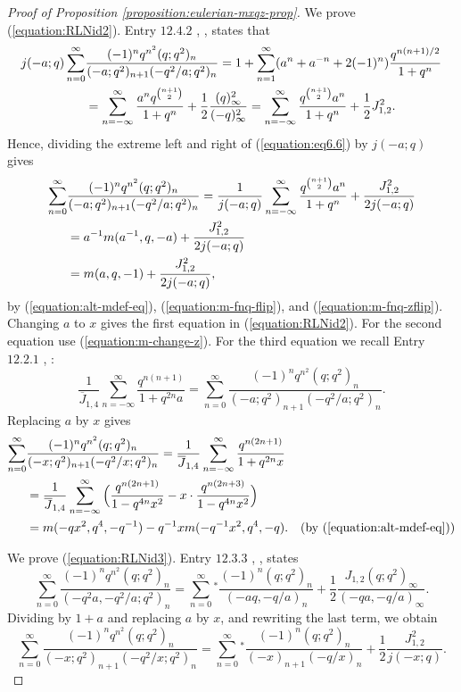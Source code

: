 \documentclass[12pt,reqno]{amsart}
\theoremstyle{remark}
\theoremstyle{definition}
\numberwithin{theorem}{section} \numberwithin{equation}{section}
\numberwithin{example}{section}
\begin{document}
\begin{proof}[Proof of Proposition \ref{proposition:eulerian-mxqz-prop}]
We prove (\ref{equation:RLNid2}).   Entry $12.4.2$ \cite {ABI}, \cite[p. 5]{RLN}, states that
{\allowdisplaybreaks \begin{align}
j(-a;q)\sum_{n=0}^{\infty}& \frac{(-1)^nq^{n^2}(q;q^2)_n}{(-a;q^2)_{n+1}(-q^2/a;q^2)_n}=1+\sum_{n=1}^{\infty}(a^n+a^{-n}+2(-1)^n)\frac{q^{n(n+1)/2}}{1+q^n}\label{equation:eq6.6}\\
&=\sum_{n=-\infty}^{\infty}\frac{a^nq^{\binom{n+1}{2}}}{1+q^n}+\frac{1}{2}\frac{(q)_{\infty}^2}{(-q)_{\infty}^2}=\sum_{n=-\infty}^{\infty}\frac{q^{\binom{n+1}{2}}a^n}{1+q^n}+\frac{1}{2}J_{1,2}^2.\notag
\end{align}}Hence, dividing the extreme left and right of (\ref{equation:eq6.6}) by $j(-a;q)$ gives
\begin{align}
\sum_{n=0}^{\infty}&\frac{(-1)^nq^{n^2}(q;q^2)_n}{(-a;q^2)_{n+1}(-q^2/a;q^2)_n}=\frac{1}{j(-a;q)}\sum_{n=-\infty}^{\infty}\frac{q^{\binom{n+1}{2}}a^n}{1+q^n}+\frac{J_{1,2}^2}{2j(-a;q)}\label{equation:eq6.9}\\
&=a^{-1}m(a^{-1},q,-a)+\frac{J_{1,2}^2}{2j(-a;q)}\notag\\
&=m(a,q,-1)+\frac{J_{1,2}^2}{2j(-a;q)},\notag
\end{align}
by (\ref{equation:alt-mdef-eq}), (\ref{equation:m-fnq-flip}), and (\ref{equation:m-fnq-zflip}).  Changing $a$ to $x$ gives the first equation in (\ref{equation:RLNid2}).  For the second equation use (\ref{equation:m-change-z}).  For the third equation  we recall Entry $12.2.1$ \cite {ABI}, \cite[p. 1] {RLN}:
\begin{equation}
\frac{1}{\overline{J}_{1,4}}\sum_{n=-\infty}^{\infty}\frac{q^{n(n+1)}}{1+q^{2n}a}=\sum_{n=0}^{\infty}\frac{(-1)^nq^{n^2}(q;q^2)_n}{(-a;q^2)_{n+1}(-q^2/a;q^2)_n}.
\end{equation}
Replacing $a$ by $x$ gives
\begin{align*}
\sum_{n=0}^{\infty}&\frac{(-1)^nq^{n^2}(q;q^2)_n}{(-x;q^2)_{n+1}(-q^2/x;q^2)_n}=\frac{1}{\overline{J}_{1,4}}\sum_{n=-\infty}^{\infty} \frac{q^{n(2n+1)}}{1+q^{2n}x}\\
&=\frac{1}{\overline{J}_{1,4}}\sum_{n=-\infty}^{\infty} \Big (\frac{q^{n(2n+1)}}{1-q^{4n}x^2} -x\cdot\frac{q^{n(2n+3)}}{1-q^{4n}x^2} \Big )\\
&=m(-qx^2,q^4,-q^{-1})-q^{-1}xm(-q^{-1}x^2,q^4,-q).&({\text{by } (\ref{equation:alt-mdef-eq})})
\end{align*}

We prove (\ref{equation:RLNid3}).  Entry $12.3.3$ \cite{ABI}, \cite[p. 4]{RLN}, states
\begin{equation*}
\sum_{n=0}^{\infty}\frac{(-1)^nq^{n^2}(q;q^2)_n}{(-q^2a,-q^2/a;q^2)_n}=\sum_{n=0}^{\infty}{}^*\frac{(-1)^n(q;q^2)_n}{(-aq,-q/a)_n}+\frac{1}{2}\frac{J_{1,2}(q;q^2)_{\infty}}{(-qa,-q/a)_{\infty}}.
\end{equation*}
Dividing by $1+a$ and replacing $a$ by $x$, and rewriting the last term, we obtain
\begin{equation*}
\sum_{n=0}^{\infty}\frac{(-1)^nq^{n^2}(q;q^2)_n}{(-x;q^2)_{n+1}(-q^2/x;q^2)_n}=\sum_{n=0}^{\infty}{}^*\frac{(-1)^n(q;q^2)_n}{(-x)_{n+1}(-q/x)_n}+\frac{1}{2}\frac{J_{1,2}^2}{j(-x;q)}.
\end{equation*}


\end{proof}
\end{document}

